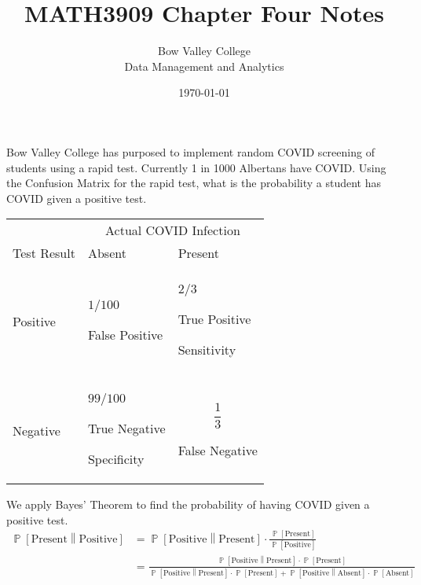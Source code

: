 \documentclass[answers]{exam}
\title{MATH3909 Chapter Four Notes}
\date{\today}
\author{Bow Valley College\\Data Management and Analytics}
\begin{document}
    \begin{questions}
        \textbf{\thequestiontitle}

        Bow Valley College has purposed to implement random COVID screening of students
        using a rapid test. Currently 1 in 1000 Albertans have COVID. Using the Confusion
        Matrix for the rapid test, what is the probability a student has COVID given a
        positive test.
        \begin{longtable}{lp{3cm}p{3cm}}
            & \multicolumn{2}{c}{Actual COVID Infection} \\
            Test Result & Absent & Present\\
            \hline
            \endhead\\
            Positive &
            $1/100$ \par False Positive &
            $2/3$ \par True Positive \par Sensitivity\\\\
            Negative &
            $99/100$ \par True Negative \par Specificity &
            $$\frac{1}{3}$$ \par False Negative
        \end{longtable}
        \begin{solution}
            We apply Bayes' Theorem to find the probability of having COVID given a positive
            test.
            \begin{align*}
                \operatorname{\mathbb{P}}\left[ \text{Present} \middle\| \text{Positive} \right]
                & = 
                \operatorname{\mathbb{P}}\left[ \text{Positive} \middle\| \text{Present} \right]
                \cdot
                \frac{\operatorname{\mathbb{P}}\left[ \text{Present} \right]}
                {\operatorname{\mathbb{P}}\left[ \text{Positive} \right]}
                \\ & =
                \frac{\operatorname{\mathbb{P}}\left[ \text{Positive} \middle\| \text{Present} \right] \cdot \operatorname{\mathbb{P}}\left[ \text{Present} \right]}
                {\operatorname{\mathbb{P}}\left[ \text{Positive} \middle\| \text{Present} \right] \cdot \operatorname{\mathbb{P}}\left[ \text{Present} \right] + \operatorname{\mathbb{P}}\left[ \text{Positive} \middle\| \text{Absent} \right] \cdot \operatorname{\mathbb{P}}\left[ \text{Absent} \right]}

\end{align*}
\end{solution}
\end{questions}
\end{document}
